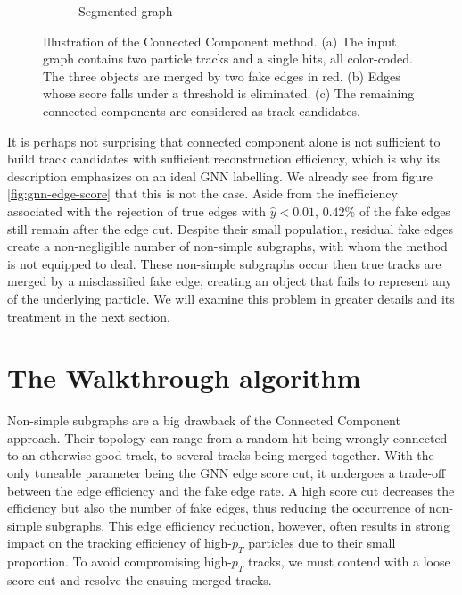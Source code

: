 \begin{figure}[h!]
\begin{subfigure}[b]{0.33\textwidth}
    \vspace{0.5cm}
    \caption{Segmented graph}
    \label{subfig:gnn-segmented-graph}
\end{subfigure}
\caption{Illustration of the Connected Component method. (a) The input graph contains two particle tracks and a single hits, all color-coded. The three objects are merged by two fake edges in red. (b) Edges whose score falls under a threshold is eliminated. (c) The remaining connected components are considered as track candidates. }
\label{fig:connected-component}
\end{figure}

It is perhaps not surprising that connected component alone is not sufficient to build track candidates with sufficient reconstruction efficiency, which is why its description emphasizes on an ideal GNN labelling.
We already see from figure \ref{fig:gnn-edge-score} that this is not the case. 
Aside from the inefficiency associated with the rejection of true edges with $\hat{y}<0.01$, $0.42\%$ of the fake edges still remain after the edge cut. 
Despite their small population, residual fake edges create a non-negligible number of non-simple subgraphs, with whom the method is not equipped to deal.
These non-simple subgraphs occur then true tracks are merged by a misclassified fake edge, creating an object that fails to represent any of the underlying particle.
We will examine this problem in greater details and its treatment in the next section.

\section{The Walkthrough algorithm}
\label{sect:walk}

Non-simple subgraphs are a big drawback of the Connected Component approach. 
Their topology can range from a random hit being wrongly connected to an otherwise good track, to several tracks being merged together. 
With the only tuneable parameter being the GNN edge score cut, it undergoes a trade-off between the edge efficiency and the fake edge rate. 
A high score cut decreases the efficiency but also the number of fake edges, thus reducing the occurrence of non-simple subgraphs. 
This edge efficiency reduction, however, often results in strong impact on the tracking efficiency of high-$p_T$ particles due to their small proportion. 
To avoid compromising high-$p_T$ tracks, we must contend with a loose score cut and resolve the ensuing merged tracks.

